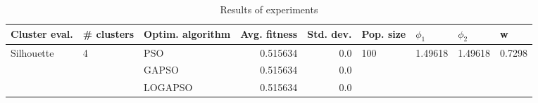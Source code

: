 \begin{table}
\centering
\caption{Results of experiments}
\begin{tabular}{lllrrllll}
\toprule
              Cluster eval. &        \# clusters & Optim. algorithm &  Avg. fitness &  Std. dev. &            Pop. size &               $\phi_{1}$ &               $\phi_{2}$ &                       w \\
\midrule
\multirow{3}{*}{Silhouette} & \multirow{3}{*}{4} &              PSO &      0.515634 &        0.0 & \multirow{3}{*}{100} & \multirow{3}{*}{1.49618} & \multirow{3}{*}{1.49618} & \multirow{3}{*}{0.7298} \\
                            &                    &            GAPSO &      0.515634 &        0.0 &                      &                          &                          &                         \\
                            &                    &          LOGAPSO &      0.515634 &        0.0 &                      &                          &                          &                         \\
\bottomrule
\end{tabular}
\end{table}
